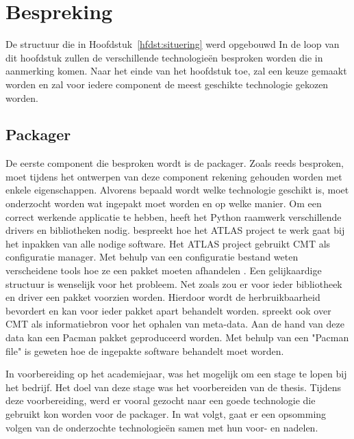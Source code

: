 \chapter{Bespreking}
De structuur die in Hoofdstuk~\ref{hfdst:situering} werd opgebouwd
In de loop van dit hoofdstuk zullen de verschillende technologieën besproken worden die in aanmerking komen.
Naar het einde van het hoofdstuk toe, zal een keuze gemaakt worden en zal voor iedere component de meest geschikte technologie gekozen worden.

\section{Packager}
De eerste component die besproken wordt is de packager.
Zoals reeds besproken, moet tijdens het ontwerpen van deze component rekening gehouden worden met enkele eigenschappen.
Alvorens bepaald wordt welke technologie geschikt is, moet onderzocht worden wat ingepakt moet worden en op welke manier.
Om een correct werkende applicatie te hebben, heeft het Python raamwerk verschillende drivers en bibliotheken nodig.
\citet{Obreshkov2008244} bespreekt hoe het ATLAS project te werk gaat bij het inpakken van alle nodige software.
Het ATLAS project gebruikt CMT als configuratie manager.
Met behulp van een configuratie bestand weten verscheidene tools hoe ze een pakket moeten afhandelen \citep{Obreshkov2008244}.
Een gelijkaardige structuur is wenselijk voor het probleem.
Net zoals \citet{Obreshkov2008244} zou er voor ieder bibliotheek en driver een pakket voorzien worden.
Hierdoor wordt de herbruikbaarheid bevordert en kan voor ieder pakket apart behandelt worden.
\citet{packAtlas} spreekt ook over CMT als informatiebron voor het ophalen van meta-data.
Aan de hand van deze data kan een Pacman pakket geproduceerd worden.
Met behulp van een "Pacman file" is geweten hoe de ingepakte software behandelt moet worden.

In voorbereiding op het academiejaar, was het mogelijk om een stage te lopen bij het bedrijf.
Het doel van deze stage was het voorbereiden van de thesis.
Tijdens deze voorbereiding, werd er vooral gezocht naar een goede technologie die gebruikt kon worden voor de packager.
In wat volgt, gaat er een opsomming volgen van de onderzochte technologieën samen met hun voor- en nadelen.

